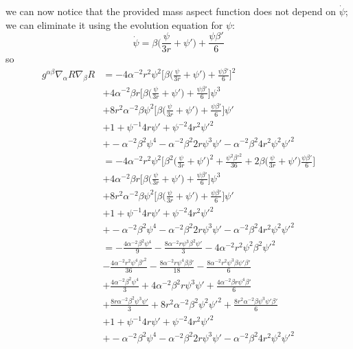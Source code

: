 \documentclass[12pt]{article}
\numberwithin{equation}{section}
\begin{document}
we can now notice that the provided mass aspect function does not depend on $\dot{\psi}$; we can eliminate it using the evolution equation for $\psi$:
\begin{equation}
\dot{\psi} = \beta \Big( \frac{\psi}{3 r} + \psi' \Big) + \frac{\psi \beta'}{6}
\end{equation}
so
\begin{equation}
\begin{aligned}
g^{\alpha \beta} \nabla_\alpha R \nabla_\beta R &= -4 \alpha^{-2} r^2 \psi^2 \Big[ \beta \Big( \frac{\psi}{3 r} + \psi' \Big) + \frac{\psi \beta'}{6} \Big]^2 \\
&+ 4 \alpha^{-2} \beta r \Big[ \beta \Big( \frac{\psi}{3 r} + \psi' \Big) + \frac{\psi \beta'}{6} \Big] \psi^3 \\
&+ 8 r^2 \alpha^{-2} \beta \psi^2 \Big[ \beta \Big( \frac{\psi}{3 r} + \psi' \Big) + \frac{\psi \beta'}{6} \Big] \psi' \\
&+ 1 + \psi^{-1} 4 r \psi' + \psi^{-2} 4 r^2 \psi'^2 \\
&+ -\alpha^{-2} \beta^2 \psi^4 - \alpha^{-2} \beta^2 2 r \psi^3 \psi' - \alpha^{-2} \beta^2 4 r^2 \psi^2 \psi'^2 \\
&= -4 \alpha^{-2} r^2 \psi^2 \Big[ \beta^2 \Big( \frac{\psi}{3 r} + \psi' \Big)^2 + \frac{\psi^2 \beta'^2}{36} + 2 \beta \Big(\frac{\psi}{3r} + \psi'\Big) \frac{\psi \beta'}{6} \Big] \\
&+ 4 \alpha^{-2} \beta r \Big[ \beta \Big( \frac{\psi}{3 r} + \psi' \Big) + \frac{\psi \beta'}{6} \Big] \psi^3 \\
&+ 8 r^2 \alpha^{-2} \beta \psi^2 \Big[ \beta \Big( \frac{\psi}{3 r} + \psi' \Big) + \frac{\psi \beta'}{6} \Big] \psi' \\
&+ 1 + \psi^{-1} 4 r \psi' + \psi^{-2} 4 r^2 \psi'^2 \\
&+ -\alpha^{-2} \beta^2 \psi^4 - \alpha^{-2} \beta^2 2 r \psi^3 \psi' - \alpha^{-2} \beta^2 4 r^2 \psi^2 \psi'^2 \\
&= - \frac{4 \alpha^{-2} \beta^2 \psi^4}{9} - \frac{8 \alpha^{-2} r \psi^3 \beta^2  \psi'}{3} - 4 \alpha^{-2} r^2 \psi^2 \beta^2 \psi'^2  \\
&- \frac{4 \alpha^{-2} r^2 \psi^4 \beta'^2}{36} - \frac{8 \alpha^{-2} r \psi^4 \beta \beta'}{18} - \frac{8 \alpha^{-2} r^2 \psi^3 \beta \psi' \beta'}{6} \\
&+ \frac{4 \alpha^{-2} \beta^2 \psi^4}{3} + 4 \alpha^{-2} \beta^2 r \psi^3 \psi' + \frac{4 \alpha^{-2} \beta r \psi^4 \beta'}{6}   \\
&+ \frac{8 r \alpha^{-2} \beta^2 \psi^3 \psi'}{3} + 8 r^2 \alpha^{-2} \beta^2 \psi^2 \psi'^2 + \frac{8 r^2 \alpha^{-2} \beta \psi^3 \psi' \beta'}{6} \\
&+ 1 + \psi^{-1} 4 r \psi' + \psi^{-2} 4 r^2 \psi'^2 \\
&+ -\alpha^{-2} \beta^2 \psi^4 - \alpha^{-2} \beta^2 2 r \psi^3 \psi' - \alpha^{-2} \beta^2 4 r^2 \psi^2 \psi'^2 \\
\end{aligned}
\end{equation}
\end{document}
